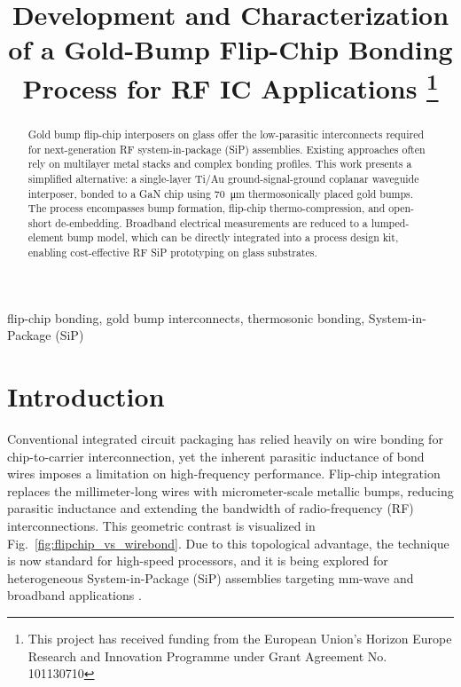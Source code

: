 \documentclass[conference,a4paper]{IEEEtran}
\begin{document}
\title{Development and Characterization of a Gold-Bump Flip-Chip Bonding Process for RF IC Applications
\thanks{This project has received funding from the European Union's Horizon Europe Research and Innovation Programme under Grant Agreement No. 101130710}
}

\author{
}

\maketitle

\pagestyle{siitme}
\thispagestyle{siitme}

\begin{abstract}
Gold bump flip-chip interposers on glass offer the low-parasitic interconnects required for next-generation RF system-in-package (SiP) assemblies. Existing approaches often rely on multilayer metal stacks and complex bonding profiles. This work presents a simplified alternative: a single-layer Ti/Au ground-signal-ground coplanar waveguide interposer, bonded to a GaN chip using \SI{70}{\micro\meter} thermosonically placed gold bumps. The process encompasses bump formation, flip-chip thermo-compression, and open-short de-embedding. Broadband electrical measurements are reduced to a lumped-element bump model, which can be directly integrated into a process design kit, enabling cost-effective RF SiP prototyping on glass substrates.
\end{abstract}

\begin{IEEEkeywords}
flip-chip bonding, gold bump interconnects, thermosonic bonding, System-in-Package (SiP)
\end{IEEEkeywords}

\IEEEpeerreviewmaketitle

\section{Introduction}
Conventional integrated circuit packaging has relied heavily on wire bonding for chip-to-carrier interconnection, yet the inherent parasitic inductance of bond wires imposes a limitation on high-frequency performance. Flip-chip integration replaces the millimeter-long wires with micrometer-scale metallic bumps, reducing parasitic inductance and extending the bandwidth of radio-frequency (RF) interconnections. This geometric contrast is visualized in Fig.~\ref{fig:flipchip_vs_wirebond}. Due to this topological advantage, the technique is now standard for high-speed processors, and it is being explored for heterogeneous System-in-Package (SiP) assemblies targeting mm-wave and broadband applications \cite{Lau2016,Heinrich2005}.
\end{document}
